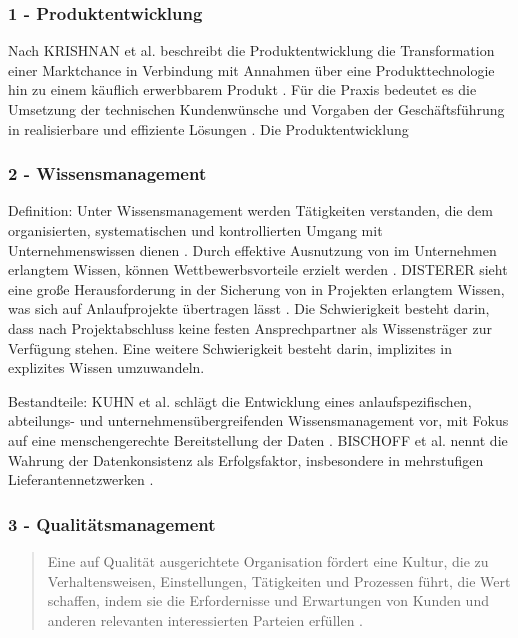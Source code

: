 \subsubsection*{1 - Produktentwicklung}
Nach KRISHNAN et al. beschreibt die Produktentwicklung die Transformation einer Marktchance in Verbindung mit Annahmen über eine Produkttechnologie hin zu einem käuflich erwerbbarem Produkt \cite{Krishnan20}. Für die Praxis bedeutet es die Umsetzung der technischen Kundenwünsche und Vorgaben der Geschäftsführung in realisierbare und effiziente Lösungen \cite[9]{Scholz2010}. 
Die Produktentwicklung 

\subsubsection*{2 - Wissensmanagement}

Definition: 
Unter Wissensmanagement werden Tätigkeiten verstanden, die dem organisierten, systematischen und kontrollierten Umgang mit Unternehmenswissen dienen \cite{Disterer2000}. Durch effektive Ausnutzung von im Unternehmen erlangtem Wissen, können Wettbewerbsvorteile erzielt werden \cite{Bischoff2007}. 
DISTERER sieht eine große Herausforderung in der Sicherung von in Projekten erlangtem Wissen, was sich auf Anlaufprojekte übertragen lässt \cite{Disterer2000}. %
Die Schwierigkeit besteht darin, dass nach Projektabschluss keine festen Ansprechpartner als Wissensträger zur Verfügung stehen. Eine weitere Schwierigkeit besteht darin, implizites in explizites Wissen umzuwandeln. %

Bestandteile: 
KUHN et al. schlägt die Entwicklung eines anlaufspezifischen, abteilungs- und unternehmensübergreifenden Wissensmanagement vor, mit Fokus auf eine menschengerechte Bereitstellung der Daten \cite{Kuhn2002}. 
BISCHOFF et al. nennt die Wahrung der Datenkonsistenz als Erfolgsfaktor, insbesondere in mehrstufigen Lieferantennetzwerken \cite{Bischoff2007}. 

\subsubsection*{3 - Qualitätsmanagement}
\begin{quotation}
 Eine auf Qualität ausgerichtete Organisation fördert eine Kultur, die zu Verhaltensweisen, Einstellungen, Tätigkeiten und Prozessen führt, die Wert schaffen, indem sie die Erfordernisse und Erwartungen von Kunden und anderen relevanten interessierten Parteien erfüllen \cite[10]{ISO9000}. %
\end{quotation}


